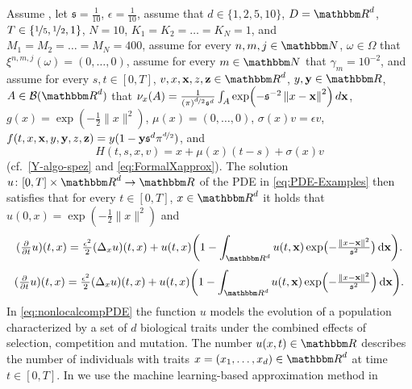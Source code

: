 Assume , 
let 
$\mathfrak{s} = \tfrac{1}{10}$,
$\epsilon =\tfrac{1}{10}$,
assume that
$d\in\{1,2,5,10\}$,
$\D = \R^d$,
$T\in\{\nicefrac{1}{5},\nicefrac{1}{2},1\}$,
$N=10$,
$K_1 = K_2 = \ldots = K_N= 1$, and
$M_1 = M_2 = \ldots = M_N = 400$,
assume for every 
$n,m,j\in \N$, $\omega \in \Omega$ 
that 
$\xi^{n,m,j}(\omega)=(0,\dots,0)$,
assume for every 
$m \in \N$
that
$\gamma_m = 10^{-2}$,
and 
assume for every 
$s,t \in [0,T]$, 
$v,x,{\textbf x},z, {\textbf z} \in \R^d$, 
$y,{\textbf y} \in \R$,
$A \in \mathcal{B}(\R^d)$
that
$\nu_x(A) = \frac{1}{(\pi)^{\nicefrac{d}{2}}\mathfrak{s}^d}\int_A \exp\!\left(-\mathfrak{s}^{-2}\left\| x - {\textbf x} \right\|^2\right)d{\textbf x}$,
$g(x)= \exp (-\tfrac{1}{2}\|x\|^2)$,
$\mu(x)=(0,\dots,0)$,
$\sigma(x) v=\epsilon v$, 
$f(t,x,{\textbf x},y,{\textbf y}, z, {\textbf z})=  y(1 - {\textbf y} \mathfrak{s}^d\pi^{\nicefrac{d}{2}})$, and
\begin{equation}
	H(t,s,x,v)=x + \mu(x)(t-s)+ \sigma(x)v
\end{equation}
(cf.\ \eqref{Y-algo-spez} and \eqref{eq:FormalXapprox}).
The solution $u\colon[0,T]\times \R^d \to \R$ of the PDE in \eqref{eq:PDE-Examples} then satisfies that for every
$t\in [0,T]$, $x\in\R^d$ 
it holds that 
$u(0,x)=\exp (-\tfrac{1}{2}\|x\|^2)$ and
\begin{equation}
 (\tfrac{\partial}{\partial t}u)(t,x)
 =
 \tfrac{\epsilon^2}{2}(\Delta_x u)(t,x) + u(t,x) \!\left(1 - \int_{\R^d} u(t,{\textbf x}) \exp \bigl(-\tfrac{\norm{x-{\textbf x}}^2}{\mathfrak{s}^2} \bigl) \, \d {\textbf x} \right)\! .
 \label{eq:nonlocalcompPDE}
\end{equation}
\begin{equation}
	(\tfrac{\partial}{\partial t}u)(t,x)
	=
	\tfrac{\epsilon^2}{2}(\Delta_x u)(t,x) + u(t,x) \!\left(1 - \int_{\R^d} u(t,{\textbf x}) \exp \Bigl(-\tfrac{\norm{x-{\textbf x}}^2}{\mathfrak{s}^2} \Bigl) \, \d {\textbf x} \right)\! .
	\label{eq:nonlocalcompPDE}
\end{equation}
%
%
In \eqref{eq:nonlocalcompPDE} the function $u$ models the evolution of a population characterized by a set of $d$ biological traits under the combined effects of selection, competition and mutation. 
The number $u(x,t) \in \R$ describes the number of individuals with traits $x = (x_1, \dots, x_d) \in \R^d$ at time $t \in [0,T]$.
In 
we use the machine learning-based approximation method
in 

